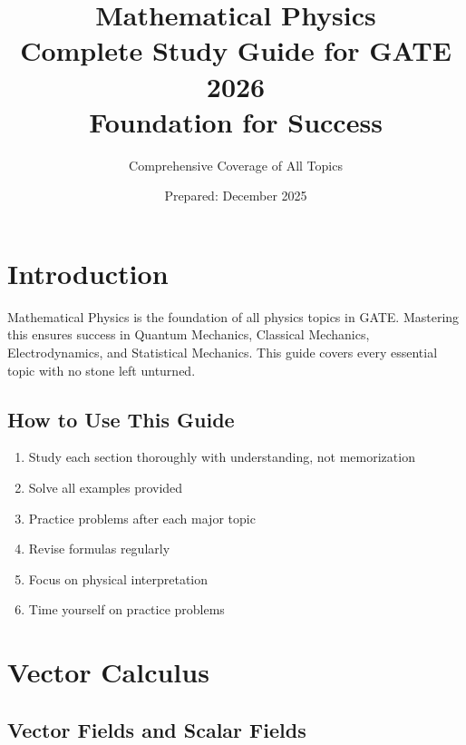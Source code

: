 \documentclass[12pt,a4paper]{article}
\title{\Huge\textbf{Mathematical Physics}\\[0.3cm]
\Large Complete Study Guide for GATE 2026\\[0.2cm]
\large Foundation for Success}
\author{Comprehensive Coverage of All Topics}
\date{Prepared: December 2025}
\theoremstyle{definition}
\begin{document}
\maketitle
\newpage

\tableofcontents
\newpage

\section{Introduction}

\begin{importantbox}
Mathematical Physics is the foundation of all physics topics in GATE. Mastering this ensures success in Quantum Mechanics, Classical Mechanics, Electrodynamics, and Statistical Mechanics. This guide covers every essential topic with no stone left unturned.
\end{importantbox}

\subsection{How to Use This Guide}
\begin{enumerate}
    \item Study each section thoroughly with understanding, not memorization
    \item Solve all examples provided
    \item Practice problems after each major topic
    \item Revise formulas regularly
    \item Focus on physical interpretation
    \item Time yourself on practice problems
\end{enumerate}

\newpage
\section{Vector Calculus}

\subsection{Vector Fields and Scalar Fields}
\end{document}
